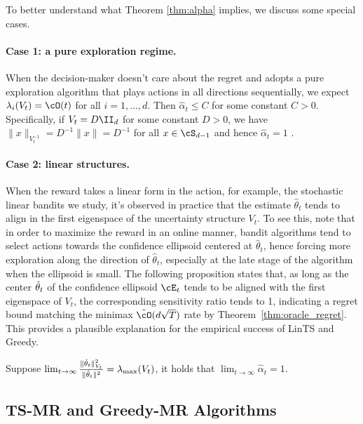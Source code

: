 To better understand what Theorem \ref{thm:alpha} implies, we discuss some special cases. 

\paragraph{Case 1: a pure exploration regime.} \label{eg:pure} When the decision-maker doesn't care about the regret and adopts a pure exploration algorithm that plays actions in all directions sequentially, we expect $\lambda_i(V_t) = \cO(t)$ for all $i = 1,\dots, d$. Then $\hat{\alpha}_t \leq C$ for some constant $C>0$. Specifically, if $V_t = D \II_d$ for some constant $D>0$, we have $\|x\|_{V_t^{-1}} =D^{-1} \|x\| = D^{-1}$ for all $x \in \cS_{d-1}$ and hence $ \hat{\alpha}_t = 1$  .

\paragraph{Case 2:  linear structures.} 
\label{eg:principle_eigen}

When the reward takes a linear form in the action, for example, the stochastic linear bandits we study,  it's observed in practice that the estimate $\hat{\theta}_t$ tends to align in the first eigenspace of the uncertainty structure $V_t$. To see this, note that in order to maximize the reward in an online manner, bandit algorithms tend to select actions towards the confidence ellipsoid centered at  $\hat{\theta}_t$, hence forcing more exploration along the direction of $\hat{\theta}_t$, especially at the late stage of the algorithm when the ellipsoid is small. The following proposition states that, as long as the center $\hat{\theta}_t$ of the confidence ellipsoid $\cE_t$  tends to be aligned with the first eigenspace of $V_t$, the corresponding sensitivity ratio tends to 1, indicating a regret bound matching the minimax $\tilde{\cO}(d\sqrt{T})$ rate by Theorem~\ref{thm:oracle_regret}. This provides a plausible explanation for the empirical success of LinTS and Greedy.
\begin{proposition}\label{prop:align}
	 Suppose $\lim_{t\to \infty}\frac{\|\hat{\theta}_t\|_{V_{t}}^2}{\|\hat{\theta}_t\|^2} =\lambda_{\max}(V_{t}) $, it holds that $\lim_{t\to \infty} \hat{\alpha}_t = 1$.	
\end{proposition}





\subsection{TS-MR and Greedy-MR Algorithms}




